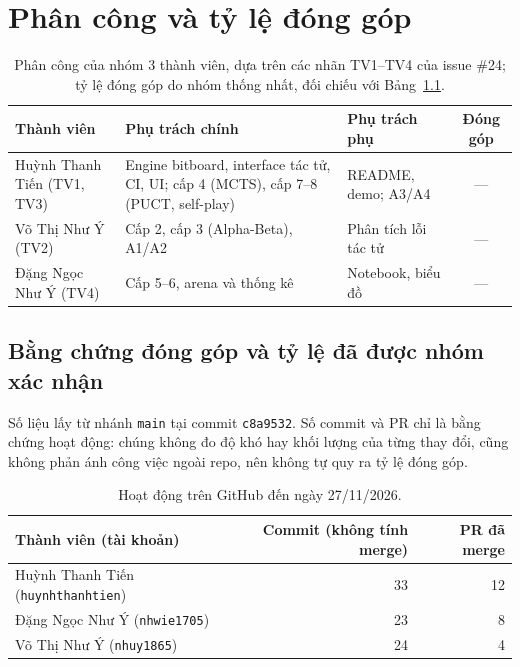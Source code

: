 \chapter{Phân công và tỷ lệ đóng góp}
\label{app:phan-cong}

\begin{table}[H]
  \centering
  \small
  \begin{tabularx}{\textwidth}{>{\raggedright\arraybackslash}p{} X X c}
    \toprule
    \textbf{Thành viên} & \textbf{Phụ trách chính} & \textbf{Phụ trách phụ} & \textbf{Đóng góp} \\
    \midrule
    Huỳnh Thanh Tiến (TV1, TV3) & Engine bitboard, interface tác tử, CI, UI; cấp 4 (MCTS), cấp 7--8 (PUCT, self-play) & README, demo; A3/A4 & --- \\
    Võ Thị Như Ý (TV2) & Cấp 2, cấp 3 (Alpha-Beta), A1/A2 & Phân tích lỗi tác tử & --- \\
    Đặng Ngọc Như Ý (TV4) & Cấp 5--6, arena và thống kê & Notebook, biểu đồ & --- \\
    \bottomrule
  \end{tabularx}
  \caption{Phân công của nhóm 3 thành viên, dựa trên các nhãn TV1--TV4 của issue \#24; tỷ lệ đóng góp do nhóm thống nhất, đối chiếu với Bảng~\ref{tab:dong-gop}.}
\end{table}

\section{Bằng chứng đóng góp và tỷ lệ đã được nhóm xác nhận}
\label{sec:bang-chung-dong-gop}
Số liệu lấy từ nhánh \texttt{main} tại commit \texttt{c8a9532}. Số commit và PR chỉ là bằng chứng hoạt động: chúng không đo độ khó hay khối lượng của từng thay đổi, cũng không phản ánh công việc ngoài repo, nên không tự quy ra tỷ lệ đóng góp.

\begin{table}[H]
  \centering\small
  \begin{tabular}{@{}lrr@{}}
    \toprule
    \textbf{Thành viên (tài khoản)} & \textbf{Commit (không tính merge)} & \textbf{PR đã merge} \\
    \midrule
    Huỳnh Thanh Tiến (\texttt{huynhthanhtien}) & 33 & 12 \\
    Đặng Ngọc Như Ý (\texttt{nhwie1705}) & 23 & 8 \\
    Võ Thị Như Ý (\texttt{nhuy1865}) & 24 & 4 \\
    \bottomrule
  \end{tabular}
  \caption{Hoạt động trên GitHub đến ngày 27/11/2026.}
  \label{tab:dong-gop}
\end{table}

